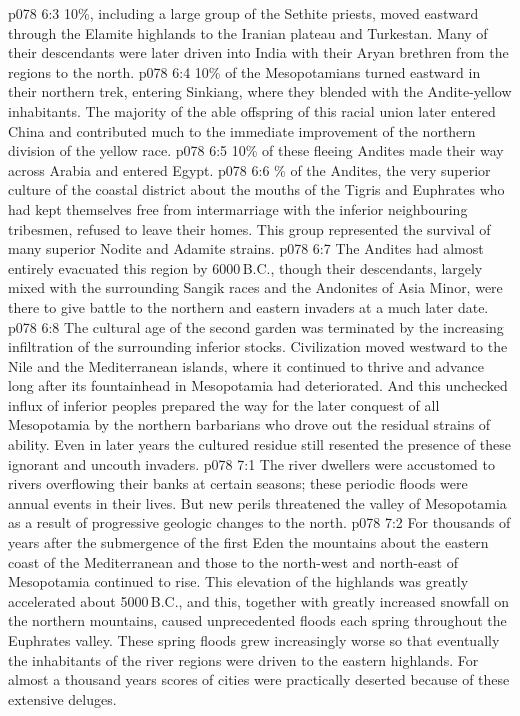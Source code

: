 \vs p078 6:3 10\%, including a large group of the Sethite priests, moved eastward through the Elamite highlands to the Iranian plateau and Turkestan. Many of their descendants were later driven into India with their Aryan brethren from the regions to the north.
\vs p078 6:4 10\% of the Mesopotamians turned eastward in their northern trek, entering Sinkiang, where they blended with the Andite\hyp{}yellow inhabitants. The majority of the able offspring of this racial union later entered China and contributed much to the immediate improvement of the northern division of the yellow race.
\vs p078 6:5 10\% of these fleeing Andites made their way across Arabia and entered Egypt.
\vs p078 6:6 \% of the Andites, the very superior culture of the coastal district about the mouths of the Tigris and Euphrates who had kept themselves free from intermarriage with the inferior neighbouring tribesmen, refused to leave their homes. This group represented the survival of many superior Nodite and Adamite strains.
\vs p078 6:7 \pc The Andites had almost entirely evacuated this region by 6000\,B.C., though their descendants, largely mixed with the surrounding Sangik races and the Andonites of Asia Minor, were there to give battle to the northern and eastern invaders at a much later date.
\vs p078 6:8 The cultural age of the second garden was terminated by the increasing infiltration of the surrounding inferior stocks. Civilization moved westward to the Nile and the Mediterranean islands, where it continued to thrive and advance long after its fountainhead in Mesopotamia had deteriorated. And this unchecked influx of inferior peoples prepared the way for the later conquest of all Mesopotamia by the northern barbarians who drove out the residual strains of ability. Even in later years the cultured residue still resented the presence of these ignorant and uncouth invaders.
\vs p078 7:1 The river dwellers were accustomed to rivers overflowing their banks at certain seasons; these periodic floods were annual events in their lives. But new perils threatened the valley of Mesopotamia as a result of progressive geologic changes to the north.
\vs p078 7:2 For thousands of years after the submergence of the first Eden the mountains about the eastern coast of the Mediterranean and those to the north\hyp{}west and north\hyp{}east of Mesopotamia continued to rise. This elevation of the highlands was greatly accelerated about 5000\,B.C., and this, together with greatly increased snowfall on the northern mountains, caused unprecedented floods each spring throughout the Euphrates valley. These spring floods grew increasingly worse so that eventually the inhabitants of the river regions were driven to the eastern highlands. For almost a thousand years scores of cities were practically deserted because of these extensive deluges.
